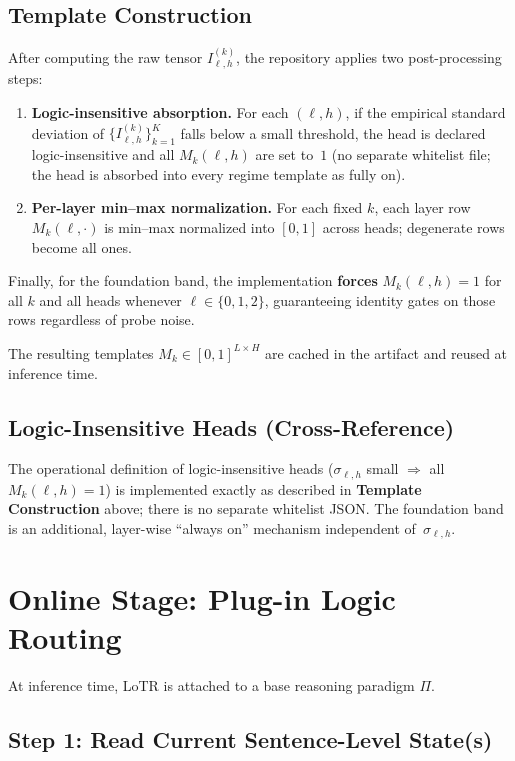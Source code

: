 \documentclass[11pt]{article}
\begin{document}
\subsection{Template Construction}

After computing the raw tensor $I_{\ell,h}^{(k)}$, the repository applies two post-processing steps:
\begin{enumerate}[leftmargin=1.5em]
    \item \textbf{Logic-insensitive absorption.} For each $(\ell,h)$, if the empirical standard deviation of $\{I_{\ell,h}^{(k)}\}_{k=1}^{K}$ falls below a small threshold, the head is declared logic-insensitive and all $M_k(\ell,h)$ are set to~$1$ (no separate whitelist file; the head is absorbed into every regime template as fully on).
    \item \textbf{Per-layer min--max normalization.} For each fixed $k$, each layer row $M_k(\ell,\cdot)$ is min--max normalized into $[0,1]$ across heads; degenerate rows become all ones.
\end{enumerate}

Finally, for the foundation band, the implementation \textbf{forces} $M_k(\ell,h)=1$ for all $k$ and all heads whenever $\ell\in\{0,1,2\}$, guaranteeing identity gates on those rows regardless of probe noise.

The resulting templates $M_k\in[0,1]^{L\times H}$ are cached in the artifact and reused at inference time.

\subsection{Logic-Insensitive Heads (Cross-Reference)}

The operational definition of logic-insensitive heads ($\sigma_{\ell,h}$ small $\Rightarrow$ all $M_k(\ell,h)=1$) is implemented exactly as described in \textbf{Template Construction} above; there is no separate whitelist JSON. The foundation band is an additional, layer-wise ``always on'' mechanism independent of~$\sigma_{\ell,h}$.

\section{Online Stage: Plug-in Logic Routing}

At inference time, LoTR is attached to a base reasoning paradigm $\Pi$.

\subsection{Step 1: Read Current Sentence-Level State(s)}
\end{document}

